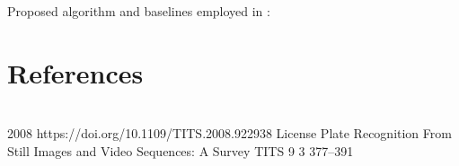 Proposed algorithm and baselines employed in : 

\section*{References}

\begin{publications}
  \\

  {
  }
  {2008}
  {https://doi.org/10.1109/TITS.2008.922938}
  {License Plate Recognition From Still Images and Video Sequences: A Survey}
  {TITS}
  {9}
  {3}
  {377--391}
  {}
  \\

\end{publications}




